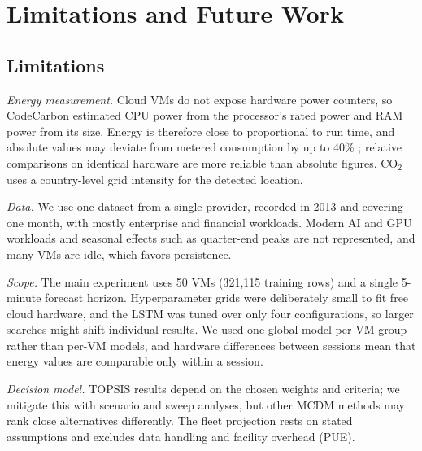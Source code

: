 \documentclass[conference,letterpaper,10pt]{IEEEtran}
\begin{document}
\section{Limitations and Future Work}
\label{sec:limitations}

\subsection{Limitations}
\textit{Energy measurement.} Cloud VMs do not expose hardware power counters, so CodeCarbon estimated CPU power from the processor's rated power and RAM power from its size. Energy is therefore close to proportional to run time, and absolute values may deviate from metered consumption by up to 40\% \cite{fischer2025groundtruth}; relative comparisons on identical hardware are more reliable than absolute figures. CO$_2$ uses a country-level grid intensity for the detected location.

\textit{Data.} We use one dataset from a single provider, recorded in 2013 and covering one month, with mostly enterprise and financial workloads. Modern AI and GPU workloads and seasonal effects such as quarter-end peaks are not represented, and many VMs are idle, which favors persistence.

\textit{Scope.} The main experiment uses 50 VMs (321{,}115 training rows) and a single 5-minute forecast horizon. Hyperparameter grids were deliberately small to fit free cloud hardware, and the LSTM was tuned over only four configurations, so larger searches might shift individual results. We used one global model per VM group rather than per-VM models, and hardware differences between sessions mean that energy values are comparable only within a session.

\textit{Decision model.} TOPSIS results depend on the chosen weights and criteria; we mitigate this with scenario and sweep analyses, but other MCDM methods may rank close alternatives differently. The fleet projection rests on stated assumptions and excludes data handling and facility overhead (PUE).
\end{document}
